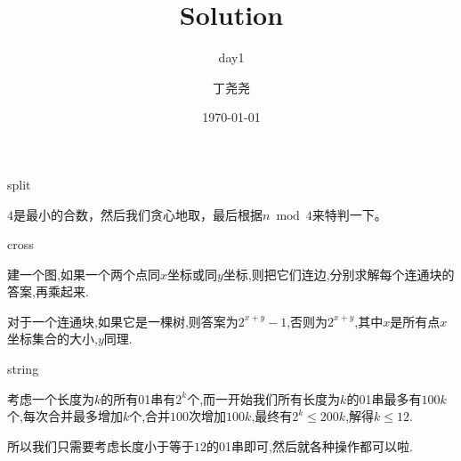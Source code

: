 \documentclass[11pt,serif]{beamer}
\begin{document}
	\author{丁尧尧}
	\title{Solution}
	\subtitle{day1}
	\date{\today}
	
	\begin{frame}[plain]
		\maketitle
	\end{frame}

	\begin{frame}{split}
		\begin{solution}
			$4$是最小的合数，然后我们贪心地取，最后根据$n \bmod 4$来特判一下。
		\end{solution}
	\end{frame}

	\begin{frame}{cross} 
		\begin{solution}
			建一个图,如果一个两个点同$x$坐标或同$y$坐标,则把它们连边,分别求解每个连通块的答案,再乘起来.
			
			对于一个连通块,如果它是一棵树,则答案为$2^{x+y} - 1$,否则为$2^{x+y}$,其中$x$是所有点$x$坐标集合的大小,$y$同理.
		\end{solution}	
	\end{frame}

	\begin{frame}{string}
		\begin{solution}
			考虑一个长度为$k$的所有01串有$2^k$个,而一开始我们所有长度为$k$的01串最多有$100k$个,每次合并最多增加$k$个,合并$100$次增加$100k$,最终有$2^k \leq 200k$,解得$k \leq 12$.
			
			所以我们只需要考虑长度小于等于$12$的01串即可,然后就各种操作都可以啦.
		\end{solution}
	\end{frame} 
\end{document}
